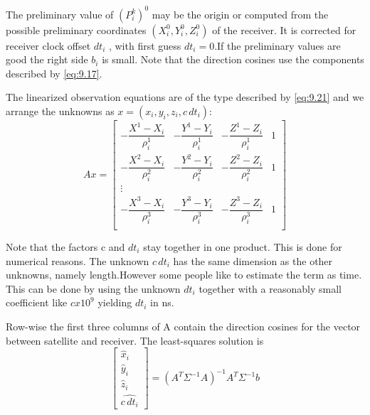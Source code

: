 	The preliminary value of $(P^k_i)^0$ may be the origin or computed from the possible preliminary coordinates $(X^0_i,Y^0_i,Z^0_i)$ of the receiver. It is corrected for receiver clock offset $dt_i$ , with first guess $dt_i=0$.If the preliminary values are good the right side $b_i$ is small. Note that the direction cosines use the components described by \ref{eq:9.17}.
	
	The linearized observation equations are of the type described by \ref{eq:9.21} and we arrange the unknowns as $x=(x_i,y_i,z_i,c\,dt_i)$:
	\begin{equation}\label{eq:9.22}
		Ax=\begin{bmatrix}
		-\dfrac{X^1-X_i}{\rho^1_i} & -\dfrac{Y^1-Y_i}{\rho^1_i} & -\dfrac{Z^1-Z_i}{\rho^1_i} & 1 \\
		-\dfrac{X^2-X_i}{\rho^2_i} & -\dfrac{Y^2-Y_i}{\rho^2_i} & -\dfrac{Z^2-Z_i}{\rho^2_i} & 1 \\
		\vdots & & & \\
		-\dfrac{X^3-X_i}{\rho^3_i} & -\dfrac{Y^3-Y_i}{\rho^3_i} & -\dfrac{Z^3-Z_i}{\rho^3_i} & 1 \\
		\end{bmatrix}
	\end{equation}
	
	Note that the factors c and $dt_i$ stay together in one product. This is done for numerical reasons. The unknown $c\,dt_i$ has the same dimension as the other unknowns, namely length.However some people like to estimate the term as time. This can be done by using the unknown $dt_i$ together with a reasonably small coefficient like $c x 10^9$ yielding $dt_i$ in ns.
	
	Row-wise the first three columns of A contain the direction cosines for the vector between satellite and receiver. The least-squares solution is
	\begin{equation}\label{eq:9.23}
		\begin{bmatrix}
			\hat{x}_i \\ \hat{y}_i \\ \hat{z}_i \\ \hat{c\,dt_i}
		\end{bmatrix}
		=(A^T\Sigma^{-1}A)^{-1}A^T\Sigma^{-1}b
	\end{equation}
	
